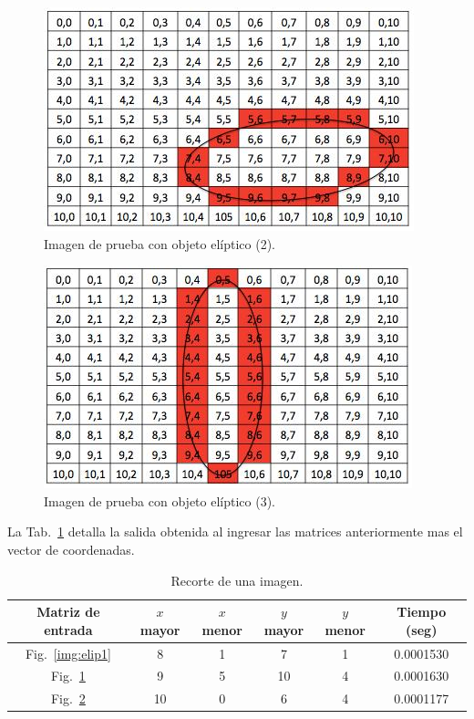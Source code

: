 \begin{figure}[ht!]
	\centering
	\includegraphics[scale=.5]{img/elip2}
	\caption{Imagen de prueba con objeto elíptico (2).}\label{img:elip2}
\end{figure}

\begin{figure}[ht!]
	\centering
	\includegraphics[scale=.5]{img/elip3}
	\caption{Imagen de prueba con objeto elíptico (3).}\label{img:elip3}
\end{figure}

La Tab.~\ref{tab:ri} detalla la salida obtenida al ingresar las matrices anteriormente mas el vector de coordenadas.

\begin{table}[ht!]
	\centering
	\begin{tabular}{c|c|c|c|c|c}
		Matriz de entrada & $x$ mayor & $x$ menor & $y$ mayor & $y$ menor & Tiempo (seg) \\\hline\hline
		Fig.~\ref{img:elip1} & 8  & 1 & 7  & 1 & 0.0001530 \\\hline
		Fig.~\ref{img:elip2} & 9  & 5 & 10 & 4 & 0.0001630 \\\hline
		Fig.~\ref{img:elip3} & 10 & 0 & 6  & 4 & 0.0001177 \\
	\end{tabular}
	\caption{Recorte de una imagen.}
	\label{tab:ri}
\end{table}

